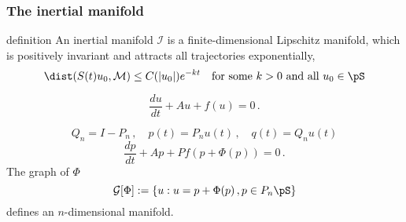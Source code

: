 \begin{frame}[shrink]%
  \frametitle{The inertial manifold\cite{Foias1988a, Robinson1995}}

  \begin{block}{definition}
    An inertial manifold $\mathcal{I}$ is a finite-dimensional Lipschitz manifold,
    which is positively invariant and attracts all trajectories exponentially,
    \begin{equation}
      \label{eq:im_def}
      \dist(S(t)u_0, \mathcal{M}) \le C(|u_0|)e^{-kt}\quad
      \text{for some } k > 0 \text{ and all } u_0 \in \pS
    \end{equation}
  \end{block}

  \begin{equation}
    \label{eq:proto}
    \frac{du}{dt} + Au + f(u) = 0
    \,.
  \end{equation}

  \begin{equation}
    \label{eq:pq}
    Q_n = I - P_n\,,\quad p(t) = P_nu(t) \,,\quad q(t) = Q_nu(t)
  \end{equation}
  \begin{equation}
    \label{eq:projected}
    \frac{dp}{dt} + Ap + Pf(p+\Phi(p)) = 0
    \,.
  \end{equation}
  The graph of $\Phi$
  \[
    \mathcal{G}[\Phi] := \{u: u = p + \Phi(p)\,, p\in P_n\pS\}
  \]
  defines an $n$-dimensional manifold.

\end{frame}
